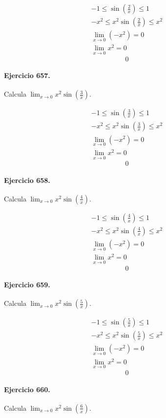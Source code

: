 \documentclass[11pt,a4paper]{article}
\begin{document}
\[
\begin{aligned}
-1\le\sin\left(\frac{2}{x}\right)\le1\\
-x^2\le x^2\sin\left(\frac{2}{x}\right)\le x^2\\
\lim_{x\to0}(-x^2)=0\\
\lim_{x\to0}x^2=0
\end{aligned}
\]
\[\boxed{0}\]


\paragraph{Ejercicio 657.} Calcula $\displaystyle\lim_{x\to0}x^2\sin\left(\frac{3}{x}\right)$.

\[
\begin{aligned}
-1\le\sin\left(\frac{3}{x}\right)\le1\\
-x^2\le x^2\sin\left(\frac{3}{x}\right)\le x^2\\
\lim_{x\to0}(-x^2)=0\\
\lim_{x\to0}x^2=0
\end{aligned}
\]
\[\boxed{0}\]


\paragraph{Ejercicio 658.} Calcula $\displaystyle\lim_{x\to0}x^2\sin\left(\frac{4}{x}\right)$.

\[
\begin{aligned}
-1\le\sin\left(\frac{4}{x}\right)\le1\\
-x^2\le x^2\sin\left(\frac{4}{x}\right)\le x^2\\
\lim_{x\to0}(-x^2)=0\\
\lim_{x\to0}x^2=0
\end{aligned}
\]
\[\boxed{0}\]


\paragraph{Ejercicio 659.} Calcula $\displaystyle\lim_{x\to0}x^2\sin\left(\frac{5}{x}\right)$.

\[
\begin{aligned}
-1\le\sin\left(\frac{5}{x}\right)\le1\\
-x^2\le x^2\sin\left(\frac{5}{x}\right)\le x^2\\
\lim_{x\to0}(-x^2)=0\\
\lim_{x\to0}x^2=0
\end{aligned}
\]
\[\boxed{0}\]


\paragraph{Ejercicio 660.} Calcula $\displaystyle\lim_{x\to0}x^2\sin\left(\frac{6}{x}\right)$.
\end{document}

